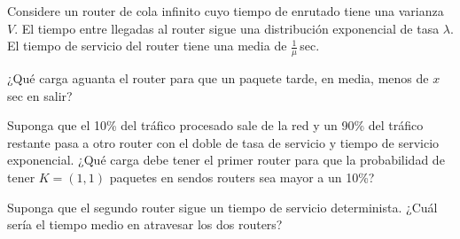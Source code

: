 \documentclass{upmassignment}
\date{\today}
\begin{document}
Considere un router de cola infinito cuyo tiempo de enrutado tiene
una varianza $V$. El tiempo entre llegadas al router sigue una
distribución exponencial de tasa $\lambda$.
El tiempo de servicio del router
tiene una media de $\tfrac{1}{\mu}$\,\textrm{sec}.


\begin{problemlist}
    \pbitem ¿Qué carga aguanta el router para que
    un paquete tarde, en media, menos de $x$\,\textrm{sec} en salir?

    \begin{solucion}
        
    \end{solucion}

    \pbitem Suponga que el 10\% del tráfico
    procesado sale de la red y un 90\%
    del tráfico restante pasa a otro
    router con el doble de tasa de servicio
    y tiempo de servicio exponencial.
    ¿Qué carga debe tener el primer
    router para que la probabilidad
    de tener $K=(1,1)$ paquetes en sendos
    routers sea mayor a un 10\%?


    \begin{solucion}
        
    \end{solucion}

    \pbitem Suponga que el segundo router
    sigue un tiempo de servicio
    determinista.
    ¿Cuál sería el tiempo medio en
    atravesar los dos routers?

    \begin{solucion}
        
    \end{solucion}



\end{problemlist}
\end{document}
